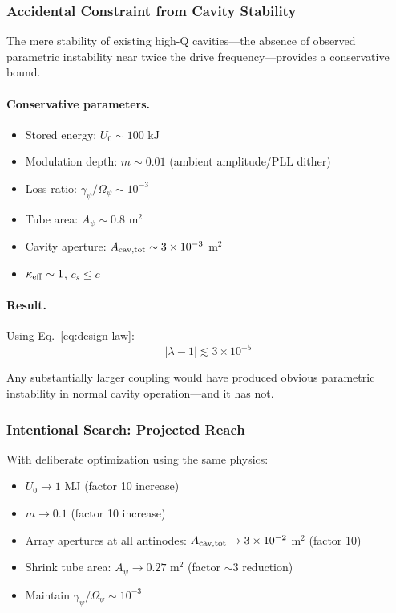 \subsubsection{Accidental Constraint from Cavity Stability}

The mere stability of existing high-Q cavities---the absence of observed 
parametric instability near twice the drive frequency---provides a 
conservative bound.

\paragraph{Conservative parameters.}
\begin{itemize}
\item Stored energy: $U_0 \sim 100$ kJ
\item Modulation depth: $m \sim 0.01$ (ambient amplitude/PLL dither)
\item Loss ratio: $\gamma_\psi/\Omega_\psi \sim 10^{-3}$
\item Tube area: $A_\psi \sim 0.8$ m$^2$
\item Cavity aperture: $A_{\rm cav,tot} \sim 3 \times 10^{-3}$ m$^2$
\item $\kappa_{\rm eff} \sim 1$, $c_s \leq c$
\end{itemize}

\paragraph{Result.}
Using Eq.~\eqref{eq:design-law}:
\begin{equation}
\boxed{|\lambda - 1| \lesssim 3 \times 10^{-5}}
\label{eq:accidental-bound}
\end{equation}

Any substantially larger coupling would have produced obvious parametric 
instability in normal cavity operation---and it has not.

\subsubsection{Intentional Search: Projected Reach}

With deliberate optimization using the same physics:
\begin{itemize}
\item $U_0 \to 1$ MJ (factor 10 increase)
\item $m \to 0.1$ (factor 10 increase)
\item Array apertures at all antinodes: $A_{\rm cav,tot} \to 3 \times 10^{-2}$ m$^2$ (factor 10)
\item Shrink tube area: $A_\psi \to 0.27$ m$^2$ (factor $\sim$3 reduction)
\item Maintain $\gamma_\psi/\Omega_\psi \sim 10^{-3}$
\end{itemize}

